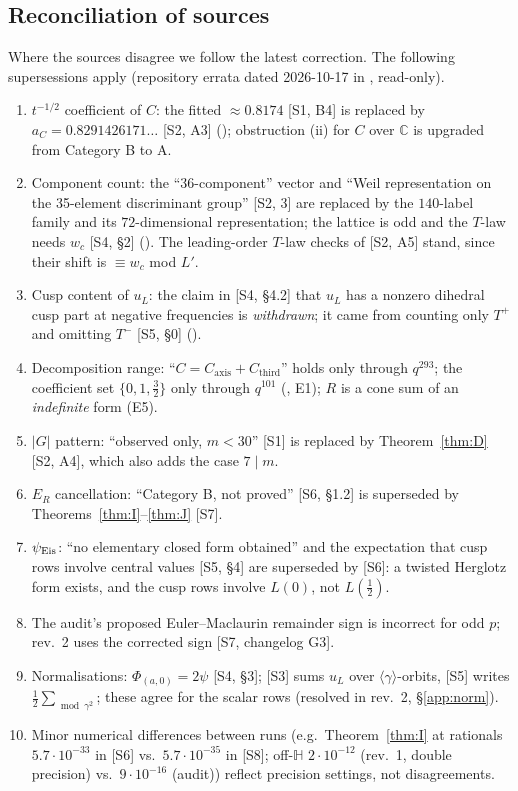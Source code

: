 \documentclass[11pt]{article}
\theoremstyle{definition}
\newcommand{\C}{\mathbb{C}}
\newcommand{\Hb}{\mathbb{H}}
\newcommand{\Cthird}{C_{\mathrm{third}}}
\newcommand{\Caxis}{C_{\mathrm{axis}}}
\newcommand{\src}[1]{\textup{[S#1]}}
\begin{document}
\subsection{Reconciliation of sources}\label{sec:recon}
Where the sources disagree we follow the latest correction. The following supersessions apply (repository errata dated 2026-10-17 in
, read-only).
\begin{enumerate}[leftmargin=2em]
\item $t^{-1/2}$ coefficient of $C$: the fitted $\approx0.8174$ \src{1, B4} is replaced by $a_C=0.8291426171\ldots$ \src{2, A3}
(); obstruction (ii) for $C$ over $\C$ is upgraded from Category B to A.
\item Component count: the ``36-component'' vector and ``Weil representation on the 35-element discriminant group'' \src{2, 3} are replaced by the
$140$-label family and its $72$-dimensional representation; the lattice is odd and the $T$-law needs $w_c$ \src{4, \S2}
(). The leading-order $T$-law checks of \src{2, A5} stand, since their shift is $\equiv w_c$ mod $L'$.
\item Cusp content of $u_L$: the claim in \src{4, \S4.2} that $u_L$ has a nonzero dihedral cusp part at negative frequencies is \emph{withdrawn};
it came from counting only $T^+$ and omitting $T^-$ \src{5, \S0} ().
\item Decomposition range: ``$C=\Caxis+\Cthird$'' holds only through $q^{293}$; the coefficient set $\{0,1,\tfrac32\}$ only through $q^{101}$
(, E1); $R$ is a cone sum of an \emph{indefinite} form (E5).
\item $|G|$ pattern: ``observed only, $m<30$'' \src{1} is replaced by Theorem~\ref{thm:D} \src{2, A4}, which also adds the case $7\mid m$.
\item $E_R$ cancellation: ``Category B, not proved'' \src{6, \S1.2} is superseded by Theorems~\ref{thm:I}--\ref{thm:J} \src{7}.
\item $\psi_{\rm Eis}$: ``no elementary closed form obtained'' and the expectation that cusp rows involve central values \src{5, \S4} are superseded by
\src{6}: a twisted Herglotz form exists, and the cusp rows involve $L(0)$, not $L(\tfrac12)$.
\item The audit's proposed Euler--Maclaurin remainder sign is incorrect for odd $p$; rev.~2 uses the corrected sign \src{7, changelog G3}.
\item Normalisations: $\Phi_{(a,0)}=2\psi$ \src{4, \S3}; \src{3} sums $u_L$ over $\langle\gamma\rangle$-orbits, \src{5} writes $\tfrac12\sum_{\bmod\gamma^2}$;
these agree for the scalar rows (resolved in rev.~2, \S\ref{app:norm}).
\item Minor numerical differences between runs (e.g.\ Theorem~\ref{thm:I} at rationals $5.7\cdot10^{-33}$ in \src{6} vs.\ $5.7\cdot10^{-35}$ in \src{8};
off-$\Hb$ $2\cdot10^{-12}$ (rev.~1, double precision) vs.\ $9\cdot10^{-16}$ (audit)) reflect precision settings, not disagreements.
\end{enumerate}
\end{document}
